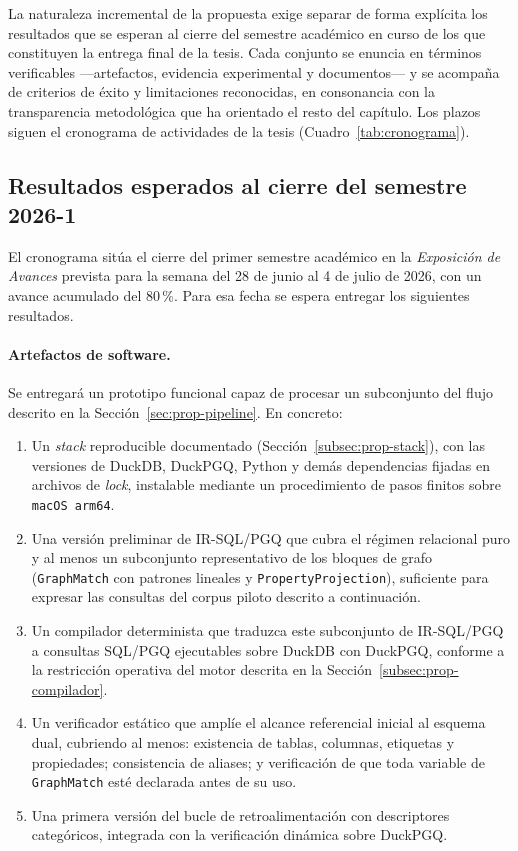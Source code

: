 La naturaleza incremental de la propuesta exige separar de forma explícita los resultados que se esperan al cierre del semestre académico en curso de los que constituyen la entrega final de la tesis. Cada conjunto se enuncia en términos verificables ---artefactos, evidencia experimental y documentos--- y se acompaña de criterios de éxito y limitaciones reconocidas, en consonancia con la transparencia metodológica que ha orientado el resto del capítulo. Los plazos siguen el cronograma de actividades de la tesis (Cuadro~\ref{tab:cronograma}). %

\subsection{Resultados esperados al cierre del semestre 2026-1}
\label{subsec:prop-resultados-sem1}

El cronograma sitúa el cierre del primer semestre académico en la \emph{Exposición de Avances} prevista para la semana del 28 de junio al 4 de julio de 2026, con un avance acumulado del 80\,\%. Para esa fecha se espera entregar los siguientes resultados.

\paragraph{Artefactos de software.} Se entregará un prototipo funcional capaz de procesar un subconjunto del flujo descrito en la Sección~\ref{sec:prop-pipeline}. En concreto:

\begin{enumerate}
    \item Un \emph{stack} reproducible documentado (Sección~\ref{subsec:prop-stack}), con las versiones de DuckDB, DuckPGQ, Python y demás dependencias fijadas en archivos de \emph{lock}, instalable mediante un procedimiento de pasos finitos sobre \texttt{macOS arm64}.
    \item Una versión preliminar de IR-SQL/PGQ que cubra el régimen relacional puro y al menos un subconjunto representativo de los bloques de grafo (\texttt{GraphMatch} con patrones lineales y \texttt{PropertyProjection}), suficiente para expresar las consultas del corpus piloto descrito a continuación.
    \item Un compilador determinista que traduzca este subconjunto de IR-SQL/PGQ a consultas \ac{SQL}/\ac{PGQ} ejecutables sobre DuckDB con DuckPGQ, conforme a la restricción operativa del motor descrita en la Sección~\ref{subsec:prop-compilador}.
    \item Un verificador estático que amplíe el alcance referencial inicial al esquema dual, cubriendo al menos: existencia de tablas, columnas, etiquetas y propiedades; consistencia de aliases; y verificación de que toda variable de \texttt{GraphMatch} esté declarada antes de su uso.
    \item Una primera versión del bucle de retroalimentación con descriptores categóricos, integrada con la verificación dinámica sobre DuckPGQ.
\end{enumerate}

